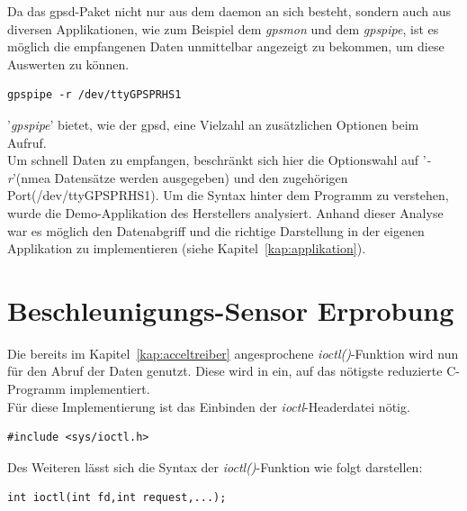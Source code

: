 Da das \ac{gpsd}-Paket nicht nur aus dem \ac{daemon} an sich besteht, sondern auch aus diversen Applikationen, wie
zum Beispiel dem \emph{gpsmon} und dem \emph{gpspipe}, ist es möglich die empfangenen Daten unmittelbar angezeigt
zu bekommen, um diese Auswerten zu können.\cite{gpsd}\\

\begin{lstlisting}[caption={Aufruf des \emph{gpspipe} in der Kommandozeile},label={code:gpspipe}]
  gpspipe -r /dev/ttyGPSPRHS1
\end{lstlisting}

'\emph{gpspipe}' bietet, wie der \ac{gpsd}, eine Vielzahl an zusätzlichen Optionen beim Aufruf.\cite{gpsd}\\
Um schnell Daten zu empfangen, beschränkt sich hier die Optionswahl auf '\emph{-r}'(\ac{nmea} Datensätze werden ausgegeben) und
den zugehörigen Port(/dev/ttyGPSPRHS1).
Um die Syntax hinter dem Programm zu verstehen, wurde die Demo-Applikation des Herstellers analysiert.
Anhand dieser Analyse war es möglich den Datenabgriff und die richtige
Darstellung in der eigenen Applikation zu implementieren (siehe Kapitel~\ref{kap:applikation}).

\section{Beschleunigungs-Sensor Erprobung}\label{kap:accelerprobung}

Die bereits im Kapitel~\ref{kap:acceltreiber} angesprochene \emph{ioctl()}-Funktion wird nun für den Abruf der Daten genutzt.
Diese wird in ein, auf das nötigste reduzierte C-Programm implementiert.\\

Für diese Implementierung ist das Einbinden der \emph{ioctl}-Headerdatei nötig.\\

\lstset{language=C}
\begin{lstlisting}[caption={Einbinden der \emph{ioctl()}-Headerdatei },label={code:ioctlheader}]
#include <sys/ioctl.h>
 \end{lstlisting}

Des Weiteren lässt sich die Syntax der \emph{ioctl()}-Funktion wie folgt darstellen:\\

 \lstset{language=C}
 \begin{lstlisting}[caption={Einbinden der \emph{ioctl()}-Headerdatei },label={code:ioctlheader}]
 int ioctl(int fd,int request,...);
  \end{lstlisting}

